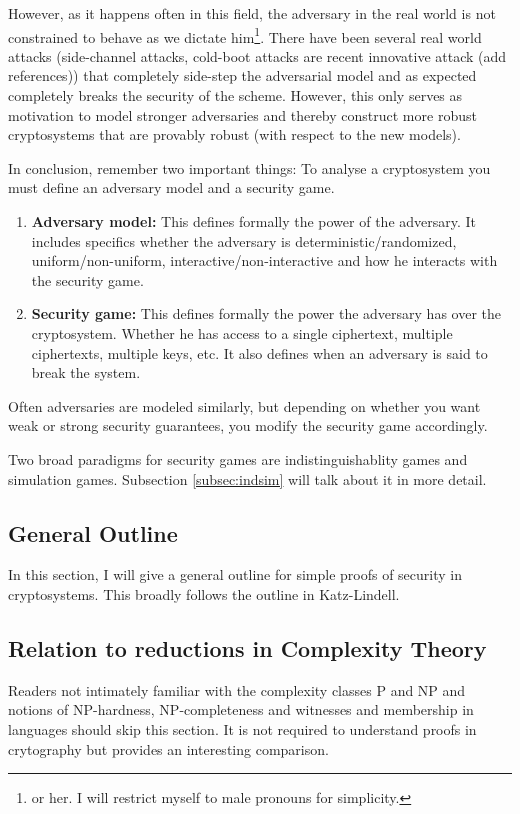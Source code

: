 \documentclass[A4, 11pt]{article}
\newcommand{\todo}[1]{\small{\sc #1}\normalsize}
\begin{document}
However, as it happens often in this field, the adversary in the real world
is not constrained to behave as we dictate him\footnote{or her. I will
restrict myself to male pronouns for simplicity.}. There have been several
real world attacks (side-channel attacks, cold-boot attacks are recent
innovative attack (\todo{add references})) that completely side-step the
adversarial model and as expected completely breaks the security of the
scheme. However, this only serves as motivation to model stronger
adversaries and thereby construct more robust cryptosystems that are
provably robust (with respect to the new models).

\par
In conclusion, remember two important things: To analyse a cryptosystem you
must define an adversary model and a security game. 

\begin{enumerate}
\item {\bf Adversary model:} This defines formally the power of the
adversary. It includes specifics whether the adversary is
deterministic/randomized, uniform/non-uniform, interactive/non-interactive
and how he interacts with the security game. 

\item {\bf Security game:} This defines formally the power the adversary
has over the cryptosystem. Whether he has access to a single ciphertext,
multiple ciphertexts, multiple keys, etc. It also defines when an adversary
is said to break the system. 
\end{enumerate}
Often adversaries are modeled similarly, but depending on whether you want
weak or strong security guarantees, you modify the security game
accordingly.

Two broad paradigms for security games are indistinguishablity games and
simulation games. Subsection \ref{subsec:indsim} will talk about it in more
detail. 

\subsection{General Outline}
In this section, I will give a general outline for simple proofs of
security in cryptosystems. This broadly follows the outline in
Katz-Lindell. 

\subsection{Relation to reductions in Complexity Theory}
Readers not intimately familiar with the complexity classes P and NP and
notions of NP-hardness, NP-completeness and witnesses and membership in
languages should skip this section. It is not required to understand proofs
in crytography but provides an interesting comparison. 
\end{document}
